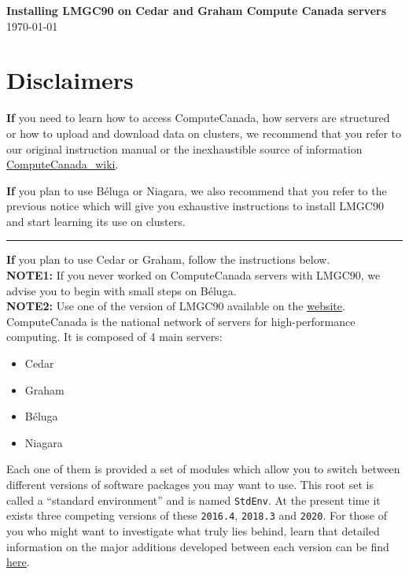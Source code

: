 \documentclass[12pt]{article}
\begin{document}
\thispagestyle{mypagestyle}

\begin{center}
  \textbf{\Large Installing LMGC90 on Cedar and Graham Compute Canada servers}\\
  \today
\end{center}

\section*{Disclaimers}
\textbf{If} you need to learn how to access ComputeCanada, how servers are structured or how to upload and download data on clusters, we recommend that you refer to our original instruction manual or the inexhaustible source of information \href{https://docs.computecanada.ca/wiki/Compute_Canada_Documentation}{\underline{ComputeCanada\_wiki}}.

\textbf{If} you plan to use Béluga or Niagara, we also recommend that you refer to the previous notice which will give you exhaustive instructions to install LMGC90 and start learning its use on clusters.\hfill \\
\rule{\linewidth}{.5pt}

\textbf{If} you plan to use Cedar or Graham, follow the instructions below.\\
\textbf{NOTE1:} If you never worked on ComputeCanada servers with LMGC90, we advise you to begin with small steps on Béluga.\\
\textbf{NOTE2:} Use one of the version of LMGC90 available on the \href{https://git-xen.lmgc.univ-montp2.fr/lmgc90/lmgc90_user/-/wikis/download_and_install}{\underline{website}}.\hfill \vspace{0.5cm}
ComputeCanada is the national network of servers for high-performance computing. It is composed of 4 main servers:
\begin{itemize}
    \item Cedar
    \item Graham
    \item Béluga
    \item Niagara
\end{itemize}

Each one of them is provided a set of modules which allow you to switch between different versions of software packages you may want to use. This root set is called a “standard environment” and is named \texttt{StdEnv}. At the present time it exists three competing versions of these \texttt{2016.4}, \texttt{2018.3} and \texttt{2020}. For those of you who might want to investigate what truly lies behind, learn that detailed information on the major additions developed between each version can be find \href{https://docs.computecanada.ca/wiki/Standard_software_environments}{\underline{here}}.
\end{document}
